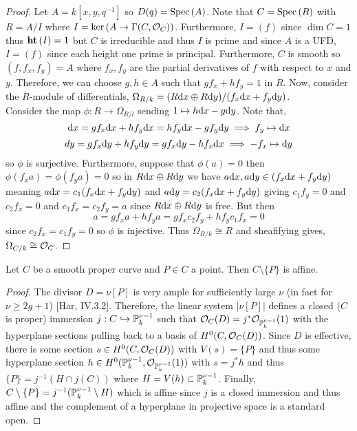 \documentclass[12pt]{article}
\begin{document}
\begin{proof}
Let $A = k[x, y, q^{-1}]$ so $D(q) = \Spec{A}$. Note that $C = \Spec{R}$ with $R = A/I$ where $I = \ker{(A \to \Gamma(C, \struct{C}))}$. Furthermore, $I = (f)$ since $\dim{C} = 1$ thus $\height{I} = 1$ but $C$ is irreducible and thus $I$ is prime and since $A$ is a UFD, $I = (f)$ since each height one prime is principal. Furthermore, $C$ is smooth so $(f, f_x, f_y) = A$ where $f_x, f_y$ are the partial derivatives of $f$ with respect to $x$ and $y$. Therefore, we can choose $g,h \in A$ such that $g f_x + h f_y = 1$ in $R$. Now, consider the $R$-module of differentials, $\Omega_{R/k} = (R \d{x} \oplus R \d{y}) /(f_x \d{x} + f_y \d{y})$. 
\bigskip\\
Consider the map $\phi : R \to \Omega_{R/l}$ sending $1 \mapsto h \d{x} - g \d{y}$. Note that,
\[ \d{x} = g f_x \d{x} + h f_y \d{x} = h f_y \d{x} - g f_y \d{y} \implies f_y \mapsto \d{x} \] 
\[ d{y} = g f_x \d{y} + h f_y \d{y} = g f_x \d{y} - h f_x \d{x} \implies -f_x \mapsto \d{y} \]
so $\phi$ is surjective. Furthermore, suppose that $\phi(a) = 0$ then $\phi(f_x a) = \phi(f_y a) = 0$ so in $R \d{x} \oplus R \d{y}$ we have $a \d{x}, a \d{y} \in (f_x \d{x} + f_y \d{y})$  meaning $a \d{x} = c_1(f_x \d{x} + f_y \d{y})$ and $a \d{y} = c_2(f_x \d{x} + f_y \d{y})$ giving $c_1 f_y = 0$ and $c_2 f_x = 0$ and $c_1 f_x = c_2 f_y = a$ since $R \d{x} \oplus R \d{y}$ is free. But then \[ a = g f_x a + h f_y a = g f_x c_2 f_y + h f_y c_1 f_x = 0 \]
since $c_2 f_x = c_1 f_y = 0$ so $\phi$ is injective. Thus $\Omega_{R/k} \cong R$ and sheafifying gives, $\Omega_{C/k} \cong \struct{C}$. 
\end{proof}

\begin{lemma} \label{affine_remove_point}
Let $C$ be a smooth proper curve and $P \in C$ a point. Then $C \setminus \{ P \}$ is affine. 
\end{lemma}

\begin{proof}
The divisor $D = \nu [P]$ is very ample for sufficiently large $\nu$ (in fact for $\nu \ge 2 g + 1$) [Har, IV.3.2]. Therefore, the linear system $|\nu [P]|$ defines a closed ($C$ is proper) immersion $j : C \embed \P^{\nu - 1}_k$ such that $\struct{C}(D) = j^* \struct{\P^{\nu-1}_k}(1)$ with the hyperplane sections pulling back to a basis of $H^0(C, \struct{C}(D))$. Since $D$ is effective, there is some section $s \in H^0(C, \struct{C}(D))$ with $V(s) = \{ P \}$ and thus some hyperplane section $h \in H^0(\P^{\nu - 1}_k, \struct{\P^{\nu-1}_k}(1))$ with $s = j^* h$ and thus $\{ P \} = j^{-1}(H \cap j(C))$ where $H = V(h) \subset \P^{\nu - 1}_k$. Finally, $C  \setminus \{ P \} = j^{-1}(\P^{\nu - 1}_k \setminus H)$ which is affine since $j$ is a closed immersion and thus affine and the complement of a hyperplane in projective space is a standard open.
\end{proof}
\end{document}
